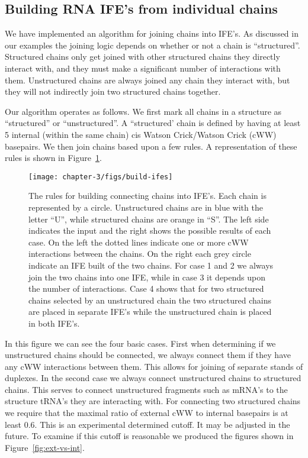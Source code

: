 \subsection{Building RNA IFE's from individual chains}

We have implemented an algorithm for joining chains into IFE's. As discussed in
our examples the joining logic depends on whether or not a chain is
``structured''. Structured chains only get joined with other structured chains
they directly interact with, and they must make a significant number of
interactions with them. Unstructured chains are always joined any chain they
interact with, but they will not indirectly join two structured chains together.

Our algorithm operates as follows. We first mark all chains in a structure as
``structured'' or ``unstructured''. A ``structured' chain is defined by having at
least 5 internal (within the same chain) cis Watson Crick/Watson Crick (cWW)
basepairs. We then join chains based upon a few rules. A representation of these
rules is shown in Figure~\ref{fig:build-ife}. 

\begin{figure}
  \texttt{[image: chapter-3/figs/build-ifes]}
  \caption{The rules for building connecting chains into IFE's. Each chain is
    represented by a circle. Unstructured chains are in blue with the letter
    ``U'', while structured chains are orange in ``S''. The left side indicates the
    input and the right shows the possible results of each case. On the left the
    dotted lines indicate one or more cWW interactions between the chains. On
    the right each grey circle indicate an IFE built of the two chains. For case
    1 and 2 we always join the two chains into one IFE, while in case 3 it
    depends upon the number of interactions. Case 4 shows that for two
    structured chains selected by an unstructured chain the two structured
    chains are placed in separate IFE’s while the unstructured chain is placed
  in both IFE's.}
  \label{fig:build-ife}
\end{figure}

In this figure we can see the four basic cases. First when determining if we
unstructured chains should be connected, we always connect them if they have any
cWW interactions between them. This allows for joining of separate stands of
duplexes. In the second case we always connect unstructured chains to structured
chains. This serves to connect unstructured fragments such as mRNA’s to the
structure tRNA’s they are interacting with. For connecting two structured chains
we require that the maximal ratio of external cWW to internal basepairs is at
least 0.6. This is an experimental determined cutoff. It may be adjusted in the
future. To examine if this cutoff is reasonable we produced the figures shown in
Figure~\ref{fig:ext-vs-int}.

